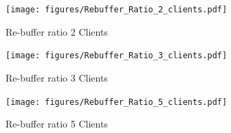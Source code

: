 \documentclass[10pt,sigconf]{acmart}
\begin{document}
\begin{figure}
  \centering
  \texttt{[image: figures/Rebuffer\_Ratio\_2\_clients.pdf]}
  \caption{Re-buffer ratio 2 Clients}
  \label{fig:rebuffer-ratio-clients-2}
\end{figure}

\begin{figure}
  \centering
  \texttt{[image: figures/Rebuffer\_Ratio\_3\_clients.pdf]}
  \caption{Re-buffer ratio 3 Clients}
  \label{fig:rebuffer-ratio-clients-3}
\end{figure}

\begin{figure}
  \centering
  \texttt{[image: figures/Rebuffer\_Ratio\_5\_clients.pdf]}
  \caption{Re-buffer ratio 5 Clients}
  \label{fig:rebuffer-ratio-clients-5}
\end{figure}



\end{document}
